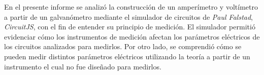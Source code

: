 En el presente informe se analizó la construcción de un amper\'imetro y
volt\'imetro a partir de un galvan\'ometro mediante el simulador de circuitos
de {\it Paul Falstad}, {\it CircuitJS}, con el fin de entender su principio
de medici\'on. El simulador permitió evidenciar c\'omo los instrumentos de
medici\'on afectan los par\'ametros el\'ectricos de los circuitos analizados
para medirlos. Por otro lado, se comprendió cómo se pueden medir distintos
parámetros eléctricos utilizando la teoría a partir de un instrumento el cual no
fue diseñado para medirlos.
